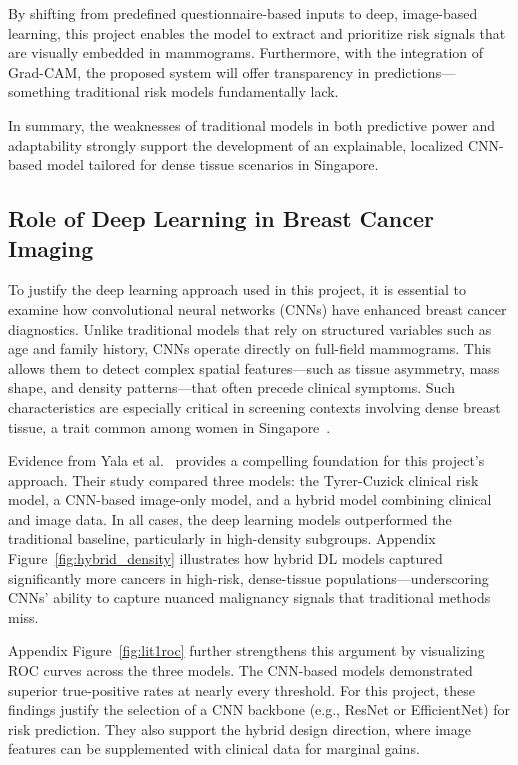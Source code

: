 \documentclass[12pt]{article}
\begin{document}
By shifting from predefined questionnaire-based inputs to deep, image-based learning, this project enables the model to extract and prioritize risk signals that are visually embedded in mammograms. Furthermore, with the integration of Grad-CAM, the proposed system will offer transparency in predictions—something traditional risk models fundamentally lack.

In summary, the weaknesses of traditional models in both predictive power and adaptability strongly support the development of an explainable, localized CNN-based model tailored for dense tissue scenarios in Singapore.

\subsection{Role of Deep Learning in Breast Cancer Imaging}

To justify the deep learning approach used in this project, it is essential to examine how convolutional neural networks (CNNs) have enhanced breast cancer diagnostics. Unlike traditional models that rely on structured variables such as age and family history, CNNs operate directly on full-field mammograms. This allows them to detect complex spatial features—such as tissue asymmetry, mass shape, and density patterns—that often precede clinical symptoms. Such characteristics are especially critical in screening contexts involving dense breast tissue, a trait common among women in Singapore~\cite{6}.

Evidence from Yala et al.~\cite{1} provides a compelling foundation for this project’s approach. Their study compared three models: the Tyrer-Cuzick clinical risk model, a CNN-based image-only model, and a hybrid model combining clinical and image data. In all cases, the deep learning models outperformed the traditional baseline, particularly in high-density subgroups. Appendix Figure~\ref{fig:hybrid_density} illustrates how hybrid DL models captured significantly more cancers in high-risk, dense-tissue populations—underscoring CNNs’ ability to capture nuanced malignancy signals that traditional methods miss.

Appendix Figure~\ref{fig:lit1roc} further strengthens this argument by visualizing ROC curves across the three models. The CNN-based models demonstrated superior true-positive rates at nearly every threshold. For this project, these findings justify the selection of a CNN backbone (e.g., ResNet or EfficientNet) for risk prediction. They also support the hybrid design direction, where image features can be supplemented with clinical data for marginal gains.
\end{document}
